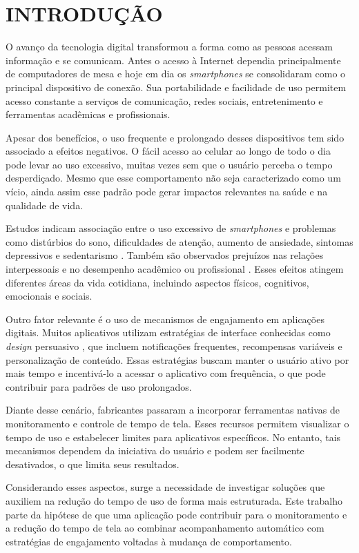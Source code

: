 \chapter{INTRODUÇÃO}

O avanço da tecnologia digital transformou a forma como as pessoas acessam informação e se comunicam. Antes o acesso à Internet dependia principalmente de computadores de mesa e hoje em dia os \textit{smartphones} se consolidaram como o principal dispositivo de conexão. Sua portabilidade e facilidade de uso permitem acesso constante a serviços de comunicação, redes sociais, entretenimento e ferramentas acadêmicas e profissionais.

Apesar dos benefícios, o uso frequente e prolongado desses dispositivos tem sido associado a efeitos negativos. O fácil acesso ao celular ao longo de todo o dia pode levar ao uso excessivo, muitas vezes sem que o usuário perceba o tempo desperdiçado. Mesmo que esse comportamento não seja caracterizado como um vício, ainda assim esse padrão pode gerar impactos relevantes na saúde e na qualidade de vida.

Estudos indicam associação entre o uso excessivo de \textit{smartphones} e problemas como distúrbios do sono, dificuldades de atenção, aumento de ansiedade, sintomas depressivos e sedentarismo \cite{chen2023, karila2025}. Também são observados prejuízos nas relações interpessoais e no desempenho acadêmico ou profissional \cite{christensen2016}. Esses efeitos atingem diferentes áreas da vida cotidiana, incluindo aspectos físicos, cognitivos, emocionais e sociais.

Outro fator relevante é o uso de mecanismos de engajamento em aplicações digitais. Muitos aplicativos utilizam estratégias de interface conhecidas como \textit{design} persuasivo \cite{chen2023}, que incluem notificações frequentes, recompensas variáveis e personalização de conteúdo. Essas estratégias buscam manter o usuário ativo por mais tempo e incentivá-lo a acessar o aplicativo com frequência, o que pode contribuir para padrões de uso prolongados.

Diante desse cenário, fabricantes passaram a incorporar ferramentas nativas de monitoramento e controle de tempo de tela. Esses recursos permitem visualizar o tempo de uso e estabelecer limites para aplicativos específicos. No entanto, tais mecanismos dependem da iniciativa do usuário e podem ser facilmente desativados, o que limita seus resultados.

Considerando esses aspectos, surge a necessidade de investigar soluções que auxiliem na redução do tempo de uso de forma mais estruturada. Este trabalho parte da hipótese de que uma aplicação pode contribuir para o monitoramento e a redução do tempo de tela ao combinar acompanhamento automático com estratégias de engajamento voltadas à mudança de comportamento.

